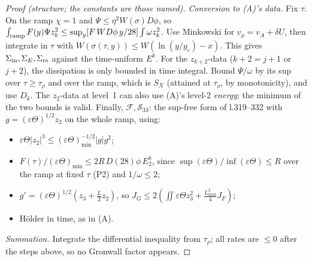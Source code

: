 \documentclass[11pt]{article}
\theoremstyle{remark}\newtheorem{remark}[theorem]{Remark}
\newcommand{\fn}[1]{\texttt{\detokenize{#1}}}
\begin{document}
\begin{proof}[Proof (structure; the constants are those named)]
\emph{Conversion to (A)'s data.} Fix $\tau$. On the ramp $\chi=1$ and $\Psi\le\eta^2W(\sigma)D\phi$, so $\int_{\rm ramp}F(y)\Psi z_k^2\le\sup_y[F\,W D\phi\,y/28]\int\omega z_k^2$. Use Minkowski for $v_\rho=v_A+\delta U$, then integrate in $\tau$ with $W(\sigma(\tau,y))\le W(\ln(y/y_c)-x)$. This gives $\Sigma_{\rm in},\Sigma_E,\Sigma_{\rm rs}$ against the time-uniform $E^k$. For the $z_{k+2}$-data ($k+2=j+1$ or $j+2$), the dissipation is only bounded in time integral. Bound $\Psi/\omega$ by its sup over $\tau\ge\tau_\rho$ and over the ramp, which is $S_X$ (attained at $\tau_\rho$, by monotonicity), and use $D_k$. The $z_2$-data at level~1 can also use (A)'s level-2 \emph{energy}; the minimum of the two bounds is valid. Finally, $\mathcal F,\mathcal S_{33}$: the sup-free form of \fn{lemmaS.tex} l.319--332 with $g=(\varepsilon\Theta)^{1/2}z_2$ on the whole ramp, using:
\begin{itemize}[itemsep=0pt]
\item $\varepsilon\Theta|z_2|^3\le(\varepsilon\Theta)_{\min}^{-1/2}|g|g^2$;
\item $F(\tau)/(\varepsilon\Theta)_{\min}\le2R\,D(28)\phi\,E^k_2$, since $\sup(\varepsilon\Theta)/\inf(\varepsilon\Theta)\le R$ over the ramp at fixed $\tau$ (P2) and $1/\omega\le2$;
\item $g'=(\varepsilon\Theta)^{1/2}(z_3+\frac L2z_2)$, so $J_G\le2(\iint\varepsilon\Theta z_3^2+\frac{L_{\max}^2}4J_F)$;
\item Hölder in time, as in (A).
\end{itemize}
\emph{Summation.} Integrate the differential inequality from $\tau_\rho$; all rates are $\le0$ after the steps above, so no Gronwall factor appears.
\end{proof}
\end{document}
